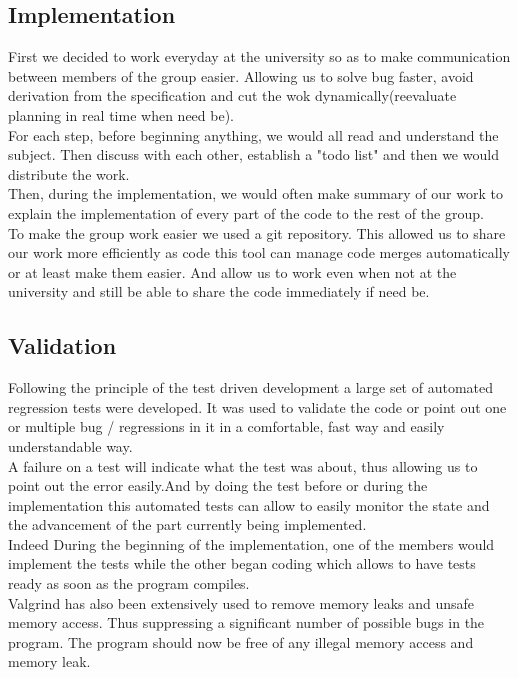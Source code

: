 \subsection{Implementation}
First we decided to work everyday at the university so as to make communication
between members of the group easier.  Allowing us to solve bug faster, avoid
derivation from the specification and cut the wok dynamically(reevaluate
planning in real time when need be).\\
For each step, before beginning anything, we would all read and understand the
subject. Then discuss with each other, establish a "todo list" and then we
would distribute the work.\\ Then, during the implementation, we would often
make summary of our work to explain the implementation of every part of the
code to the rest of the group.\\
To make the group work easier we used a git repository. This allowed us to
share our work more efficiently as code this tool can manage code merges
automatically or at least make them easier. And allow us to work even when not
at the university and still be able to share the code immediately if need be.\\

\subsection{Validation}
Following the principle of the test driven development a large set of automated
regression tests were developed.  It was used to validate the code or point out
one or multiple bug / regressions in it in a comfortable, fast way and easily
understandable way. \\
A failure on a test will indicate what the test was about, thus allowing us to
point out the error easily.And by doing the test before or during the
implementation this automated tests can allow to easily monitor the state and
the advancement of the part currently being implemented.\\
Indeed During the beginning of the  implementation, one of the members would
implement the tests while the other began coding which allows to have tests
ready as soon as the program compiles. \\
Valgrind has also been extensively used to remove memory leaks and unsafe
memory access. Thus suppressing a significant number of possible bugs in the
program. The program should now be free of any illegal memory access and memory
leak.

